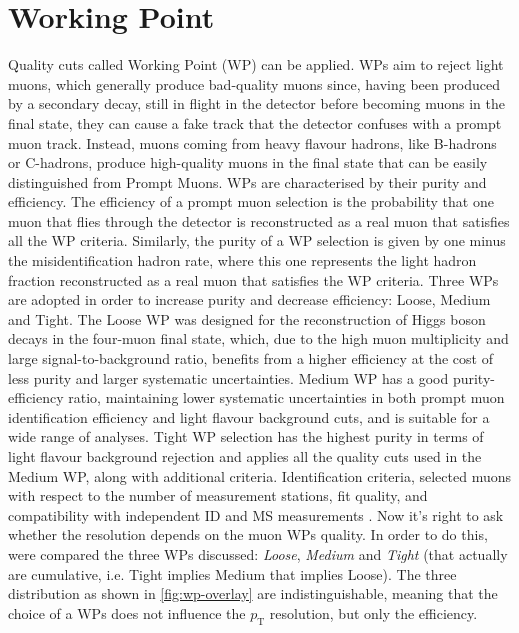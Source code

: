 \documentclass[11pt,a4paper,twoside,openright]{report}
\begin{document}
\section{Working Point}

Quality cuts called Working Point (WP) can be applied. WPs aim to reject light muons, which generally produce bad-quality muons since, having been produced by a secondary decay, still in flight in the detector before becoming muons in the final state, they can cause a fake track that the detector confuses with a prompt muon track. Instead, muons coming from heavy flavour hadrons, like B-hadrons or C-hadrons, produce high-quality muons in the final state that can be easily distinguished from Prompt Muons. WPs are characterised by their purity and efficiency. The efficiency of a prompt muon selection is the probability that one muon that flies through the detector is reconstructed as a real muon that satisfies all the WP criteria. Similarly, the purity of a WP selection is given by one minus the misidentification hadron rate, where this one represents the light hadron fraction reconstructed as a real muon that satisfies the WP criteria. Three WPs are adopted in order to increase purity and decrease efficiency: Loose, Medium and Tight. The Loose WP was designed for the reconstruction of Higgs boson decays in the four-muon final state, which, due to the high muon multiplicity and large signal-to-background ratio, benefits from a higher efficiency at the cost of less purity and larger systematic uncertainties. Medium WP has a good purity-efficiency ratio, maintaining lower systematic uncertainties in both prompt muon identification efficiency and light flavour background cuts, and is suitable for a wide range of analyses. Tight WP selection has the highest purity in terms of light flavour background rejection and applies all the quality cuts used in the Medium WP, along with additional criteria. Identification criteria, selected muons with respect to the number of measurement stations, fit quality, and compatibility with independent ID and MS measurements \cite{ATLAS-MUON-EFF-2021}. Now it's right to ask whether the resolution depends on the muon WPs quality. In order to do this, were compared the three WPs discussed: \emph{Loose}, \emph{Medium} and \emph{Tight} (that actually are cumulative, i.e. Tight implies Medium that implies Loose). The three distribution as shown in \cref{fig:wp-overlay} are indistinguishable, meaning that the choice of a WPs does not influence the $p_{\mathrm{T}}$ resolution, but only the efficiency. 
\end{document}

